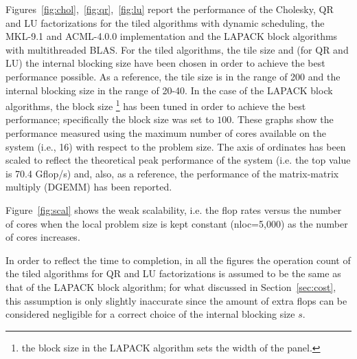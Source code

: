 \documentclass{article}
\begin{document}
Figures~\ref{fig:chol},~\ref{fig:qr},~\ref{fig:lu} report the
performance of the Cholesky, QR and LU factorizations for the tiled
algorithms with dynamic scheduling, the MKL-9.1 and ACML-4.0.0
implementation and the LAPACK block algorithms with multithreaded
BLAS. For the tiled algorithms, the tile size and (for QR and LU) the
internal blocking size have been chosen in order to achieve the best
performance possible. As a reference, the tile size is in the range of
200 and the internal blocking size in the range of 20-40.  In the case
of the LAPACK block algorithms, the block size \footnote{the block
  size in the LAPACK algorithm sets the width of the panel.} has been
tuned in order to achieve the best performance; specifically the block
size was set to $100$. These graphs show the performance
measured using the maximum number of cores available on the system
(i.e., 16) with respect to the problem size. The axis of ordinates
has been scaled to reflect the theoretical peak performance of the
system (i.e. the top value is 70.4 Gflop/s) and, also, as a
reference, the performance of the matrix-matrix multiply (DGEMM) has
been reported.

Figure~\ref{fig:scal} shows the weak scalability, i.e. the flop rates versus the
number of cores when the local problem size is kept constant
(nloc=5,000) as the number of cores increases. 

In order to reflect the time to completion, in all the figures the
operation count of the tiled algorithms for QR and LU factorizations
is assumed to be the same as that of the LAPACK block algorithm; for
what discussed in Section~\ref{sec:cost}, this assumption is only
slightly inaccurate since the amount of extra flops can be considered
negligible for a correct choice of the internal blocking size $s$.
\end{document}

